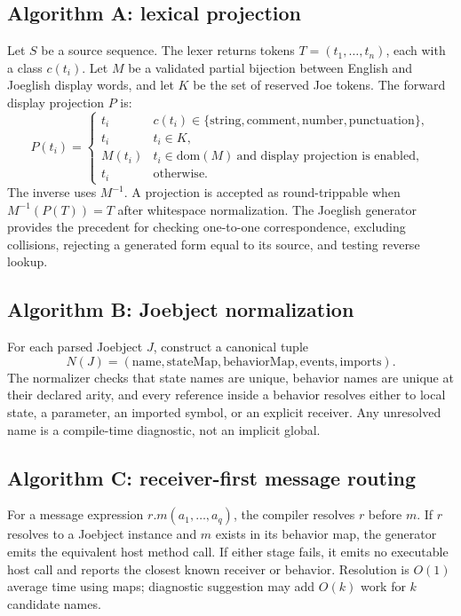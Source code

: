 \documentclass[12pt]{article}
\begin{document}
\subsection{Algorithm A: lexical projection}
Let $S$ be a source sequence. The lexer returns tokens $T=(t_1,\ldots,t_n)$, each with a class $c(t_i)$. Let $M$ be a validated partial bijection between English and Joeglish display words, and let $K$ be the set of reserved Joe tokens. The forward display projection $P$ is:
\[
P(t_i)=
\begin{cases}
t_i & c(t_i)\in\{\text{string},\text{comment},\text{number},\text{punctuation}\},\\
t_i & t_i\in K,\\
M(t_i) & t_i\in\mathrm{dom}(M)\ \text{and display projection is enabled},\\
t_i & \text{otherwise.}
\end{cases}
\]
The inverse uses $M^{-1}$. A projection is accepted as round-trippable when $M^{-1}(P(T))=T$ after whitespace normalization. The Joeglish generator provides the precedent for checking one-to-one correspondence, excluding collisions, rejecting a generated form equal to its source, and testing reverse lookup.\cite{translatorSource}

\subsection{Algorithm B: Joebject normalization}
For each parsed Joebject $J$, construct a canonical tuple
\[
N(J)=(\mathrm{name},\mathrm{stateMap},\mathrm{behaviorMap},\mathrm{events},\mathrm{imports}).
\]
The normalizer checks that state names are unique, behavior names are unique at their declared arity, and every reference inside a behavior resolves either to local state, a parameter, an imported symbol, or an explicit receiver. Any unresolved name is a compile-time diagnostic, not an implicit global.

\subsection{Algorithm C: receiver-first message routing}
For a message expression $r.m(a_1,\ldots,a_q)$, the compiler resolves $r$ before $m$. If $r$ resolves to a Joebject instance and $m$ exists in its behavior map, the generator emits the equivalent host method call. If either stage fails, it emits no executable host call and reports the closest known receiver or behavior. Resolution is $O(1)$ average time using maps; diagnostic suggestion may add $O(k)$ work for $k$ candidate names.
\end{document}
